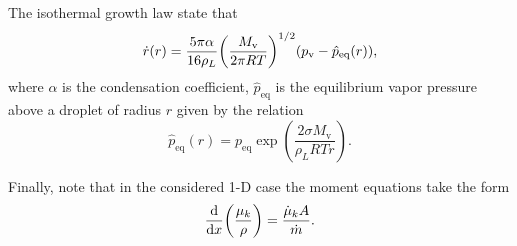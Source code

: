 \documentclass{article}
\newcommand{\vap}{\text{v}}
\newcommand{\eq}{\text{eq}}
\begin{document}
The isothermal growth law state that
\begin{equation}\label{eq:dotr}
    \dot{r}(r) = \frac{5\pi\alpha}{16\rho_L}
    \qty(\frac{M_\vap}{2\pi RT})^{1/2}
        (p_\vap-\hat{p}_\eq(r)),
\end{equation}
where $\alpha$ is the condensation coefficient,
$\hat{p}_\eq$ is the equilibrium vapor pressure above a droplet of radius $r$ given by the relation
\begin{equation}\label{eq:Kelvin}
    \hat{p}_\eq(r) = p_\eq\exp(\frac{2\sigma M_\vap}{\rho_L RT r}).
\end{equation}

Finally, note that in the considered 1-D case the moment equations take the form
\begin{equation}\label{eq:mom}
    \dv{x}(\frac{\mu_k}{\rho}) = \frac{\dot{\mu}_kA}{\dot{m}}.
\end{equation}

\end{document}
